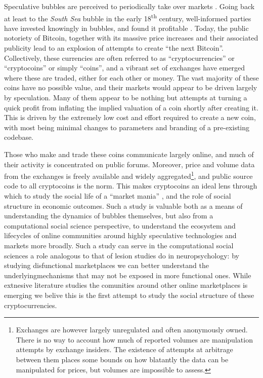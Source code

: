 Speculative bubbles are perceived to periodically take over markets \cite{garber2001famous}.
Going back at least to the \emph{South Sea} bubble in the early 18\textsuperscript{th} century, well-informed parties  have invested knowingly in bubbles, and found it profitable \cite{temin2004riding}.
Today, the public notoriety of Bitcoin, together with its massive price increases and their associated publicity lead to an explosion of attempts to create ``the next Bitcoin''.
Collectively, these currencies are often referred to as ``cryptocurrencies'' or ``cryptocoins'' or simply ``coins'', and a vibrant set of exchanges have emerged where these are traded, either for each other or money.
The vast majority of these coins have no possible value, and their markets would appear to be driven largely by speculation.
Many of them appear to be nothing but attempts at turning a quick profit from inflating the implied valuation of a coin shortly after creating it.
This is driven by the extremely low cost and effort required to create a new coin, with most being minimal changes to parameters and branding of a pre-existing codebase.

Those who make and trade these coins communicate largely online, and much of their activity is concentrated on public forums.
Moreover, price and volume data from the exchanges is freely available and widely aggregated\footnote{Exchanges are however largely unregulated and often anonymously owned. There is no way to account how much of reported volumes are manipulation attempts by exchange insiders. The existence of attempts at arbitrage between them places some bounds on how blatantly the data can be manipulated for prices, but volumes are impossible to assess. }, and public source code to all cryptocoins is the  norm.
This makes cryptocoins an ideal lens through which to study the social life of a ``market mania'' \cite{cosma2008}, and the role of social structure in economic outcomes\cite{Granovetter-outcomes}.
Such a study is valuable both as a means of understanding the dynamics of bubbles themselves, but also from a computational social science perspective, to understand the ecosystem and lifecycles of online communities around highly speculative technologies and markets more broadly.
Such a study can serve in the computational social sciences a role analogous to that of lesion studies do in neuropsychology: by studying disfunctional marketplaces we can better understand the underlyingmechanisms that may not be exposed in more functional ones.
While extnesive literature studies the comunities around other online marketplaces is emerging \cite{sastry2015predicting,gilbert2013need,luckman2013aura,chang2014specialization} we belive this is the first attempt to study the social structure of these cryptocurrencies.


